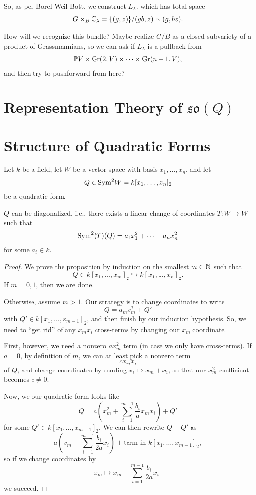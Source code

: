 \documentclass[12pt]{article}
\newcommand{\so}{\mathfrak{so}}
\DeclareMathOperator{\Gr}{Gr}
\begin{document}
So, as per Borel-Weil-Bott, we construct $L_\lambda$. which has total space
\[G\times_B \mathbb{C}_\lambda = \{(g,z)\}/(gb,z) \sim (g,bz).\]

{\color{red} How will we recognize this bundle? Maybe realize $G/B$ as a closed subvariety of a product of Grassmannians, so we can ask if $L_\lambda$ is a pullback from
\[\P V \times \Gr(2,V) \times \cdots \times \Gr(n-1,V),\]
and then try to pushforward from here?}



\section{Representation Theory of $\so(Q)$}

\section{Structure of Quadratic Forms}

Let $k$ be a field, let $W$ be a vector space with basis $x_1,\dots,x_n$, and let
\[Q\in \mathrm{Sym}^2 W = k[x_1,\dots,x_n]_2\]
be a quadratic form.

\begin{prop}
    $Q$ can be diagonalized, i.e., there exists a linear change of coordinates $T:W\to W$ such that
    \[\mathrm{Sym}^2(T)(Q) = a_1 x_1^2 + \dots + a_n x_n^2\]
    for some $a_i\in k$.
\end{prop}

\begin{proof}
    We prove the proposition by induction on the smallest $m\in \mathbb{N}$ such that
    \[Q\in k[x_1,\dots,x_m]_2 \hookrightarrow k[x_1,\dots,x_n]_2.\]
    If $m=0,1$, then we are done.
    
    Otherwise, assume $m>1$. Our strategy is to change coordinates to write
    \[Q = a_m x_m^2 + Q'\]
    with $Q'\in k[x_1,\dots,x_{m-1}]_2$, and then finish by our induction hypothesis. So, we need to ``get rid'' of any $x_m x_i$ cross-terms by changing our $x_m$ coordinate.
    
    First, however, we need a nonzero $a x_m^2$ term (in case we only have cross-terms). If $a=0$, by definition of $m$, we can at least pick a nonzero term
    \[c x_m x_i\]
    of $Q$, and change coordinates by sending $x_i \mapsto x_m+x_i$, so that our $x_m^2$ coefficient becomes $c\neq 0$.
    
    Now, we our quadratic form looks like
    \[Q = a \left(x_m^2 + \sum_{i=1}^{m-1} \frac{b_i}{a} x_m x_i\right) + Q'\]
    for some $Q'\in k[x_1,\dots,x_{m-1}]_2$. We can then rewrite $Q-Q'$ as
    \[a\left(x_m + \sum_{i=1}^{m-1} \frac{b_i}{2a} x_i\right) + \text{term in $k[x_1,\dots,x_{m-1}]_2$},\]
    so if we change coordinates by
    \[x_m \mapsto x_m - \sum_{i=1}^{m-1} \frac{b_i}{2a} x_i,\]
    we succeed.
\end{proof}
\end{document}
